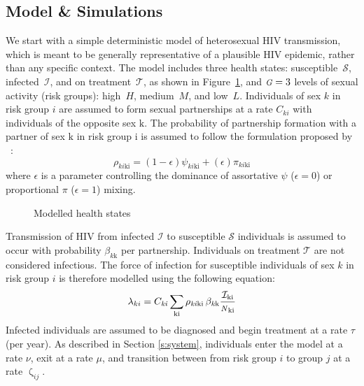 \documentclass[10pt]{article}
\numberwithin{equation}{section}
\renewcommand{\zeta}{\upzeta}
\newcommand{\N}{{\mbox{\footnotesize{\textit{N}}}}}
\newcommand{\G}{{\mbox{\footnotesize{\textit{G}}}}}
\newcommand{\fig}[1]{Figure~\ref{#1}}
\begin{document}
\subsection{Model \& Simulations}\label{ss:model}
We start with a simple deterministic model of heterosexual HIV transmission,
which is meant to be generally representative of a plausible HIV epidemic,
rather than any specific context.
The model includes three health states:
susceptible~$\mathcal{S}$, infected~$\mathcal{I}$, and on treatment~$\mathcal{T}$,
as shown in \fig{fig:health-states},
and $\G = 3$ levels of sexual activity (risk groups):
high~$H$, medium~$M$, and low~$L$.
Individuals of sex $\mathit{k}$ in risk group $i$ are assumed to
form sexual partnerships at a rate $C_{ki}$
with individuals of the opposite sex $\mathrm{k}$.
The probability of partnership formation with
a partner of sex $\mathrm{k}$ in risk group $\mathrm{i}$
is assumed to follow
the formulation proposed by \citeauthor{Garnett1994}~\cite{Garnett1994}:
\begin{equation}
  \rho_{\mathit{ki}\mathrm{ki}} =
  (1-\epsilon)\psi_{\mathit{ki}\mathrm{ki}}
   +(\epsilon)\pi_{\mathit{ki}\mathrm{ki}}
\end{equation}
where $\epsilon$ is a parameter controlling the dominance of
assortative $\psi$ ($\epsilon = 0$) or proportional $\pi$ ($\epsilon = 1$) mixing.
\begin{figure}
  \centering
  \caption{Modelled health states}\label{fig:health-states}
\end{figure}
\par
Transmission of HIV from infected $\mathcal{I}$ to susceptible $\mathcal{S}$ individuals
is assumed to occur with probability $\beta_{\mathit{k}\mathrm{k}}$ per partnership.
Individuals on treatment $\mathcal{T}$ are not considered infectious.
The force of infection for susceptible individuals of sex $k$ in risk group $i$
is therefore modelled using the following equation:%
\begin{equation}
  \lambda_{ki} =
  C_{\mathit{ki}}
  \sum_{\mathrm{ki}}
  \rho_{\mathit{ki}\mathrm{ki}} \thinspace
  \beta_{\mathit{k}\mathrm{k}}
  \frac{\mathcal{I}_{\mathrm{ki}}}{\N_{\mathrm{ki}}}
  \label{eq:foi}
\end{equation}
Infected individuals are assumed to be diagnosed and begin treatment at a rate $\tau$ (per year).
As described in Section \ref{s:system},
individuals enter the model at a rate $\nu$,
exit at a rate $\mu$,
and transition between from risk group $i$ to group $j$ at a rate $\zeta_{ij}$.
\end{document}
